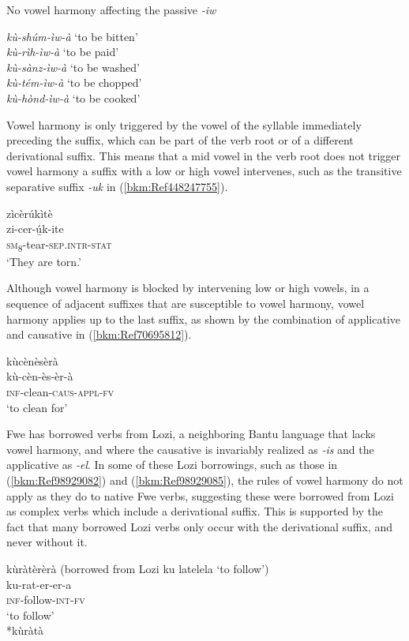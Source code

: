\ea
\label{bkm:Ref70695533}
  No vowel harmony affecting the passive \textit{-iw}

{\itshape kù-shúm-ìw-à} \tab  ‘to be bitten’\\
{\itshape kù-rìh-ìw-à} \tab  ‘to be paid’\\
{\itshape kù-sànz-ìw-à} \tab  ‘to be washed’\\
{\itshape kù-tém-ìw-à} \tab  ‘to be chopped’\\
{\itshape kù-hònd-ìw-à} \tab  ‘to be cooked’\\
\z

Vowel harmony is only triggered by the vowel of the syllable immediately preceding the suf\-fix, which can be part of the verb root or of a different derivational suffix. This means that a mid vowel in the verb root does not trigger vowel harmony a suffix with a low or high vowel intervenes, such as the transitive separative suffix \textit{-uk} in (\ref{bkm:Ref448247755}).

\ea
\label{bkm:Ref448247755}
\glll zìcèrúkìtè\\
zi-cer-ú̲k-ite\\
\textsc{sm}\textsubscript{8}-tear-\textsc{sep}.\textsc{intr}-\textsc{stat}\\
\glt ‘They are torn.’
\z

Although vowel harmony is blocked by intervening low or high vowels, in a sequence of adjacent suf\-fixes that are susceptible to vowel harmony, vowel harmony applies up to the last suffix, as shown by the combination of applicative and causative in (\ref{bkm:Ref70695812}).

\ea
\label{bkm:Ref70695812}
\glll kùcènèsèrà\\
kù-cèn-ès-èr-à\\
\textsc{inf}-clean-\textsc{caus}-\textsc{appl}-\textsc{fv}\\
\glt ‘to clean for’
\z

Fwe has borrowed verbs from Lozi, a neighboring Bantu language that lacks vowel harmony, and where the causative is invariably realized as \textit{-is} and the applicative as \textit{-el}. In some of these Lozi borrowings, such as those in (\ref{bkm:Ref98929082}) and (\ref{bkm:Ref98929085}), the rules of vowel harmony do not apply as they do to native Fwe verbs, suggesting these were borrowed from Lozi as complex verbs which include a derivational suffix. This is supported by the fact that many borrowed Lozi verbs only occur with the derivational suffix, and never without it.

\ea
\label{bkm:Ref98929082}
kùràtèrèrà (borrowed from Lozi ku latelela ‘to follow’)\\
ku-rat-er-er-a\\
\textsc{inf}-follow-\textsc{int}-\textsc{fv}\\
\glt ‘to follow’\\
*kùràtà
\z

